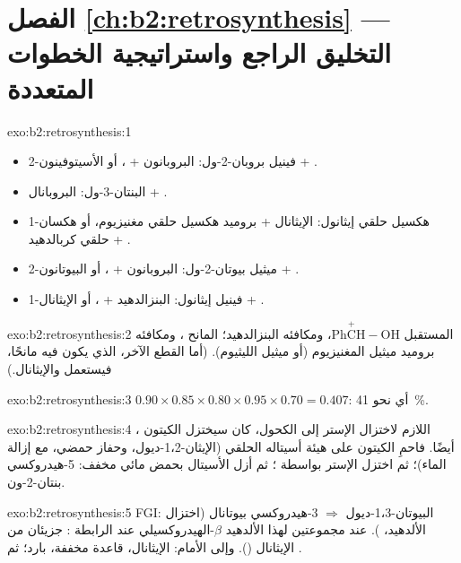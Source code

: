 \section*{الفصل \ref{ch:b2:retrosynthesis} --- التخليق الراجع واستراتيجية الخطوات المتعددة}

\begin{solution}{exo:b2:retrosynthesis:1}
\begin{itemize}
  \item 2-فينيل بروبان-2-ول: البروبانون + ، أو الأسيتوفينون + .
  \item البنتان-3-ول: البروبانال + .
  \item 1-هكسيل حلقي إيثانول: الإيثانال + بروميد هكسيل حلقي مغنيزيوم، أو هكسان حلقي كربالدهيد +
        .
  \item 2-ميثيل بيوتان-2-ول: البروبانون + ، أو البيوتانون + .
  \item 1-فينيل إيثانول: البنزالدهيد + ، أو الإيثانال + .
\end{itemize}
\end{solution}

\begin{solution}{exo:b2:retrosynthesis:2}
 المستقبل $\mathrm{Ph\overset{+}{C}H{-}OH}$، ومكافئه البنزالدهيد؛  المانح ،
ومكافئه بروميد ميثيل المغنيزيوم (أو ميثيل الليثيوم). (أما القطع الآخر، الذي يكون فيه  مانحًا، فيستعمل
 والإيثانال.)
\end{solution}

\begin{solution}{exo:b2:retrosynthesis:3}
$0.90 \times 0.85 \times 0.80 \times 0.95 \times 0.70 = 0.407$: أي نحو 41~\%.
\end{solution}

\begin{solution}{exo:b2:retrosynthesis:4}
، اللازم لاختزال الإستر إلى الكحول، كان سيختزل الكيتون أيضًا. فاحمِ
الكيتون على هيئة أسيتاله الحلقي (الإيثان-1،2-ديول، وحفاز حمضي، مع إزالة الماء)؛ ثم اختزل الإستر بواسطة
؛ ثم أزل الأسيتال بحمض مائي مخفف: 5-هيدروكسي بنتان-2-ون.
\end{solution}

\begin{solution}{exo:b2:retrosynthesis:5}
FGI: البيوتان-1،3-ديول $\Rightarrow$ 3-هيدروكسي بيوتانال (اختزال الألدهيد، ).  عند
مجموعتين لهذا الألدهيد $\beta$-الهيدروكسيلي عند الرابطة \babelsublr{$\alpha$--$\beta$}: جزيئان من الإيثانال
(). وإلى الأمام: الإيثانال، قاعدة مخففة، بارد؛ ثم .
\end{solution}

